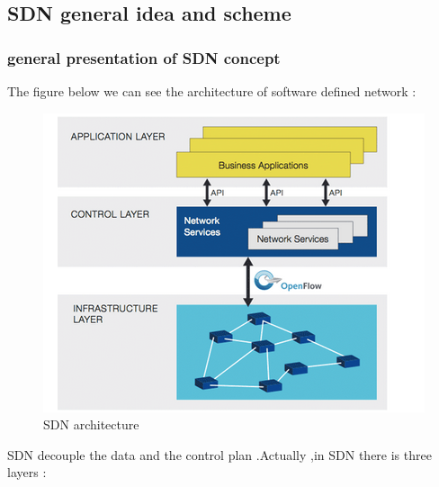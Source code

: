 \documentclass{article}
\begin{document}
\subsection{SDN general idea and scheme}

\subsubsection{general presentation of SDN concept}

The figure below we can see the architecture of software defined network :

\begin{figure}[h!]
  \centering
    \includegraphics[scale=0.5]{reportPictures/figure5.png}
  \caption{SDN architecture}
\end{figure}

SDN decouple the data and the control plan .Actually ,in SDN there is
three layers :
\end{document}

